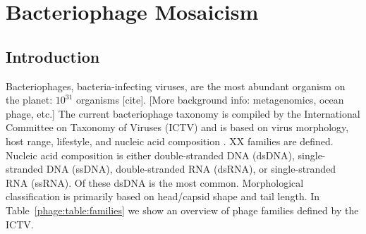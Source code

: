 \chapter{Bacteriophage Mosaicism}
\label{ch:phage}

\section{Introduction}
\label{phage:sec:introduction}

Bacteriophages, bacteria-infecting viruses, are the most abundant organism on the planet: $10^31$ organisms [cite].
[More background info: metagenomics, ocean phage, etc.]
The current bacteriophage taxonomy is compiled by the International Committee on Taxonomy of Viruses (ICTV) and is based on virus morphology, host range, lifestyle, and nucleic acid composition \cite{ICTV:2012}.
XX families are defined.
Nucleic acid composition is either double-stranded DNA (dsDNA), single-stranded DNA (ssDNA), double-stranded RNA (dsRNA), or single-stranded RNA (ssRNA).
Of these dsDNA is the most common.
Morphological classification is primarily based on head/capsid shape and tail length.
In Table~\ref{phage:table:families} we show an overview of phage families defined by the ICTV.

